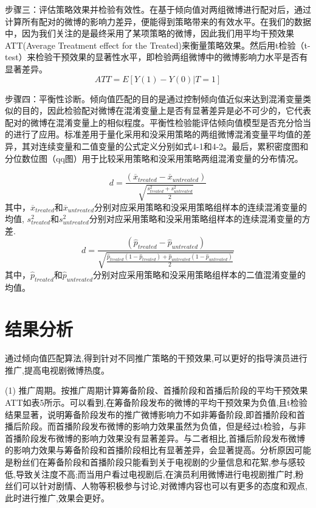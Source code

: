 步骤三：评估策略效果并检验有效性。在基于倾向值对两组微博进行配对后，通过计算所有配对的微博的影响力差异，便能得到策略带来的有效水平。在我们的数据中，因为我们关注的是最终采用了某项策略的微博，因此我们用平均干预效果ATT(Average Treatment effect for the Treated)来衡量策略效果。然后用t检验（t-test）来检验干预效果的显著性水平，即检验两组微博中的微博影响力水平是否有显著差异。
\begin{equation}ATT = E[Y(1) - Y(0) | T = 1]\end{equation}

步骤四：平衡性诊断。倾向值匹配的目的是通过控制倾向值近似来达到混淆变量类似的目的，因此检验配对微博在混淆变量上是否有显著差异是必不可少的，它代表配对的微博在混淆变量上的相似程度。平衡性检验能评估倾向值模型是否充分恰当的进行了应用。标准差用于量化采用和没采用策略的两组微博混淆变量平均值的差异\cite {14}，其对连续变量和二值变量的公式定义分别如式4-1和4-2。最后，累积密度图和分位数位图（qq图）用于比较采用策略和没采用策略两组混淆变量的分布情况。

\begin{equation}d = \frac{(\overline{x}_{treated} - \overline{x}_{untreated})}{\sqrt{\frac{s_{treated}^2 + s_{untreated}^2}{2}}}\end{equation}
其中，$\overline{x}_{treated}$和$\overline{x}_{untreated}$分别对应采用策略和没采用策略组样本的连续混淆变量的均值, $s_{treated}^2$和$s_{untreated}^2$分别对应采用策略和没采用策略组样本的连续混淆变量的方差.
\begin{equation}d = \frac{(\hat{p}_{treated} - \hat{p}_{untreated})}{\sqrt{\frac{\hat{p}_{treated}(1 - \hat{p}_{treated}) + \hat{p}_{untreated}(1 - \hat{p}_{untreated})}{2}}}\end{equation}
其中，$\hat{p}_{treated}$和$\hat{p}_{untreated}$分别对应采用策略和没采用策略组样本的二值混淆变量的均值。


\section{结果分析}
通过倾向值匹配算法,得到针对不同推广策略的干预效果,可以更好的指导演员进行推广,提高电视剧微博热度。

(1) 推广周期。按推广周期计算筹备阶段、首播阶段和首播后阶段的平均干预效果ATT如表5所示。可以看到,在筹备阶段发布的微博的平均干预效果为负值,且t检验结果显著，说明筹备阶段发布的推广微博影响力不如非筹备阶段,即首播阶段和首播后阶段。而首播阶段发布微博的影响力效果虽然为负值，但是经过t检验，与非首播阶段发布微博的影响力效果没有显著差异。与二者相比,首播后阶段发布微博的影响力效果与筹备阶段和首播阶段相比有显著差异，会显著提高。分析原因可能是粉丝们在筹备阶段和首播阶段只能看到关于电视剧的少量信息和花絮,参与感较低,导致关注度不高;而当用户看过电视剧后,在演员利用微博进行电视剧推广时,粉丝们可以针对剧情、人物等积极参与讨论,对微博内容也可以有更多的态度和观点,此时进行推广,效果会更好。

